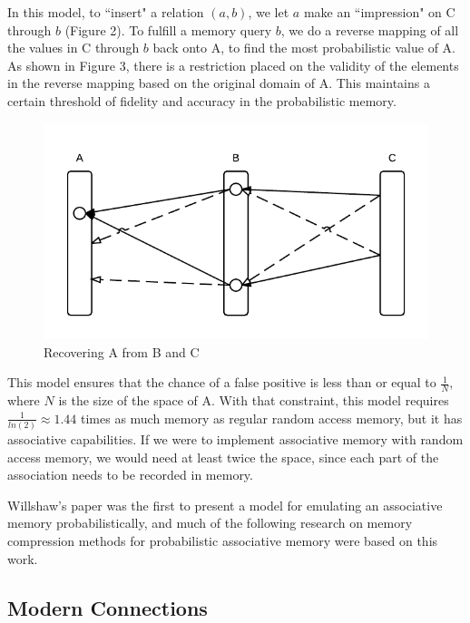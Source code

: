 \documentclass{sig-alternate}
\begin{document}
In this model, to ``insert" a relation $(a, b)$, we let $a$ make an ``impression" on C through $b$ (Figure 2).
To fulfill a memory query $b$, we do a reverse mapping of all the values in C through $b$
back onto A, to find the most probabilistic value of A. As shown in Figure 3, there is a restriction placed on the validity of the
elements in the reverse mapping based on the original domain of A. This maintains a certain threshold of fidelity and accuracy in
the probabilistic memory.

\begin{figure}[H]
	\begin{center}
		\includegraphics[width=1\linewidth]{mapping1}
	\end{center}
	\vspace{-12pt}
	\caption{Recovering A from B and C}
	\label{fig:mapping}
\end{figure}

This model ensures that the chance of a false positive is less than or equal to $\frac{1}{N}$, where $N$
is the size of the space of A. With that constraint, this model requires $\frac{1}{ln(2)} \approx 1.44$
times as much memory as regular random access memory, but it has associative capabilities. 
If we were to implement associative memory with random access memory, we would need at least twice the space,
since each part of the association needs to be recorded in memory.

Willshaw's paper was the first to present a model for emulating an associative memory
probabilistically, and much of the following research on memory compression methods
for probabilistic associative memory were based on this work.

\subsection{Modern Connections}
\label{subsec:modern}
\end{document}
